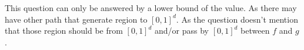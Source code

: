
This question can only be answered by a lower bound of the value.
As there may have other path that generate region to $[0,1]^d$.
As the question doesn't mention that those region should be from $[0,1]^d$ and/or pass by $[0,1]^d$ between $f$ and $g$.

